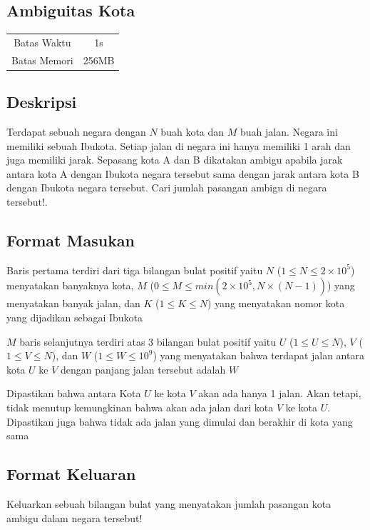 \documentclass{article}
\begin{document}
\begin{center}

    
    \section*{Ambiguitas Kota} %

    \begin{tabular}{ | c c | }
        \hline
        Batas Waktu  & 1s \\    %
        Batas Memori & 256MB \\  %
        \hline
    \end{tabular}
\end{center}

\subsection*{Deskripsi}
Terdapat sebuah negara dengan $N$ buah kota dan $M$ buah jalan. Negara ini memiliki sebuah Ibukota. Setiap jalan di negara ini hanya memiliki 1 arah dan juga memiliki jarak. Sepasang kota A dan B dikatakan ambigu apabila jarak antara kota A dengan Ibukota negara tersebut sama dengan jarak antara kota B dengan Ibukota negara tersebut. Cari jumlah pasangan ambigu di negara tersebut!. 

\subsection*{Format Masukan}
Baris pertama terdiri dari tiga bilangan bulat positif yaitu $N$ ($1 \leq N \leq 2\times10^5$) menyatakan banyaknya kota,
$M$ ($0 \leq M \leq min(2\times10^5, N\times(N-1)) $) yang menyatakan banyak jalan, dan $K$ ($1 \leq K \leq N$) yang menyatakan nomor kota yang dijadikan sebagai Ibukota

$M$ baris selanjutnya terdiri atas 3 bilangan bulat positif yaitu $U$ ($1 \leq U \leq N$), $V$ ($1 \leq V \leq N$), dan $W$ ($1 \leq W \leq 10^9$) yang menyatakan bahwa terdapat jalan antara kota $U$ ke $V$ dengan panjang jalan tersebut adalah $W$

Dipastikan bahwa antara Kota $U$ ke kota $V$ akan ada hanya 1 jalan. Akan tetapi, tidak menutup kemungkinan bahwa akan ada jalan dari kota $V$ ke kota $U$.
Dipastikan juga bahwa tidak ada jalan yang dimulai dan berakhir di kota yang sama
\subsection*{Format Keluaran}
Keluarkan sebuah bilangan bulat yang menyatakan jumlah pasangan kota ambigu dalam negara tersebut!
\end{document}
